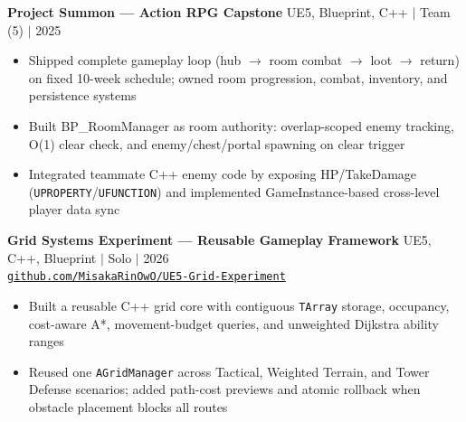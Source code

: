 \documentclass[letterpaper,10pt]{article}
\begin{document}
\smallskip

\textbf{Project Summon --- Action RPG Capstone} \hfill UE5, Blueprint, C++ $|$ Team (5) $|$ 2025
\begin{itemize}
  \item Shipped complete gameplay loop (hub $\rightarrow$ room combat $\rightarrow$ loot $\rightarrow$ return) on fixed 10-week schedule; owned room progression, combat, inventory, and persistence systems
  \item Built BP\_RoomManager as room authority: overlap-scoped enemy tracking, O(1) clear check, and enemy/chest/portal spawning on clear trigger
  \item Integrated teammate C++ enemy code by exposing HP/TakeDamage (\texttt{UPROPERTY}/\texttt{UFUNCTION}) and implemented GameInstance-based cross-level player data sync
\end{itemize}

\smallskip

\textbf{Grid Systems Experiment --- Reusable Gameplay Framework} \hfill UE5, C++, Blueprint $|$ Solo $|$ 2026\\
\href{https://github.com/MisakaRinOwO/UE5-Grid-Experiment}{\texttt{github.com/MisakaRinOwO/UE5-Grid-Experiment}}
\begin{itemize}
  \item Built a reusable C++ grid core with contiguous \texttt{TArray} storage, occupancy, cost-aware A*, movement-budget queries, and unweighted Dijkstra ability ranges
  \item Reused one \texttt{AGridManager} across Tactical, Weighted Terrain, and Tower Defense scenarios; added path-cost previews and atomic rollback when obstacle placement blocks all routes
\end{itemize}
\end{document}
